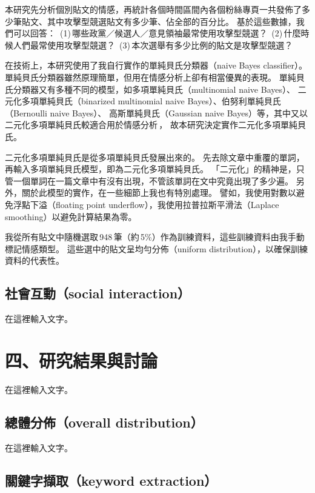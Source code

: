 \documentclass[letterpaper, 10pt, conference]{ieeeconf}   %
\begin{document}
\begin{CJK*}{UTF8}{bsmi}
本研究先分析個別貼文的情感，再統計各個時間區間內各個粉絲專頁一共發佈了多少筆貼文、其中攻擊型競選貼文有多少筆、佔全部的百分比。
基於這些數據，我們可以回答：
\,(1)\,哪些政黨／候選人／意見領袖最常使用攻擊型競選？
\,(2)\,什麼時候人們最常使用攻擊型競選？
\,(3)\,本次選舉有多少比例的貼文是攻擊型競選？

在技術上，本研究使用了我自行實作的單純貝氏分類器（naive Bayes classifier）\cite{c13}。
單純貝氏分類器雖然原理簡單，但用在情感分析上卻有相當優異的表現。
單純貝氏分類器又有多種不同的模型，如多項單純貝氏（multinomial naive Bayes）、
二元化多項單純貝氏（binarized multinomial naive Bayes）、伯努利單純貝氏（Bernoulli naive Bayes）、
高斯單純貝氏（Gaussian naive Bayes）等，其中又以二元化多項單純貝氏較適合用於情感分析\,\cite{c14}，
故本研究決定實作二元化多項單純貝氏。

二元化多項單純貝氏是從多項單純貝氏發展出來的。
先去除文章中重覆的單詞，再輸入多項單純貝氏模型，即為二元化多項單純貝氏。
「二元化」的精神是，只管一個單詞在一篇文章中有沒有出現，不管該單詞在文中究竟出現了多少遍。
另外，關於此模型的實作，在一些細節上我也有特別處理。
譬如，我使用對數以避免浮點下溢（floating point underflow），我使用拉普拉斯平滑法（Laplace smoothing）以避免計算結果為零。

我從所有貼文中隨機選取\,948\,筆（約\,5\%）作為訓練資料，這些訓練資料由我手動標記情感類型。
這些選中的貼文呈均勻分佈（uniform distribution），以確保訓練資料的代表性。

\subsection*{社會互動（social interaction）}

在這裡輸入文字。

\section*{四、研究結果與討論}

在這裡輸入文字。

\subsection*{總體分佈（overall distribution）}

在這裡輸入文字。

\subsection*{關鍵字擷取（keyword extraction）}


\end{CJK*}
\end{document}
